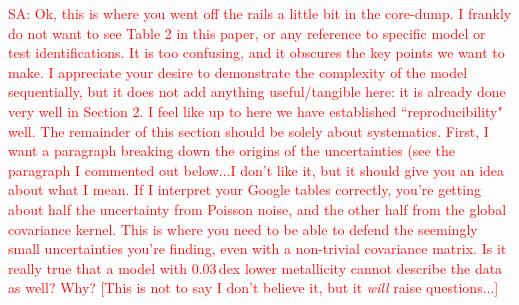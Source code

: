 \documentclass[iop,floatfix]{emulateapj}
\newcommand{\vT}{ {\bm \Theta}}
\newcommand{\vp}{ {\bm \phi}}
\newcommand{\cov}{ \vp_{\mathsf{C}}}
\newcommand{\comm}[1]{ \textcolor{red}{SA: #1}}
\begin{document}
\comm{Ok, this is where you went off the rails a little bit in the core-dump.  I frankly do not 
want to see Table 2 in this paper, or any reference to specific model or test identifications.  It 
is too confusing, and it obscures the key points we want to make.  I appreciate your desire to 
demonstrate the complexity of the model sequentially, but it does not add anything useful/tangible 
here: it is already done very well in Section 2.  I feel like up to here we have 
established ``reproducibility" well.  The remainder of this section should be solely about 
systematics.  First, I want a paragraph breaking down the origins of the uncertainties (see the 
paragraph I commented out below...I don't like it, but it should give you an idea about what I 
mean.  If I interpret your Google tables correctly, you're getting about half the uncertainty from 
Poisson noise, and the other half from the global covariance kernel.  This is where you need to be 
able to defend the seemingly small uncertainties you're finding, even with a non-trivial covariance 
matrix.  Is it really true that a model with 0.03\,dex lower metallicity cannot describe the data 
as well?  Why?  [This is not to say I don't believe it, but it {\it will} raise questions...]}

\end{document}

